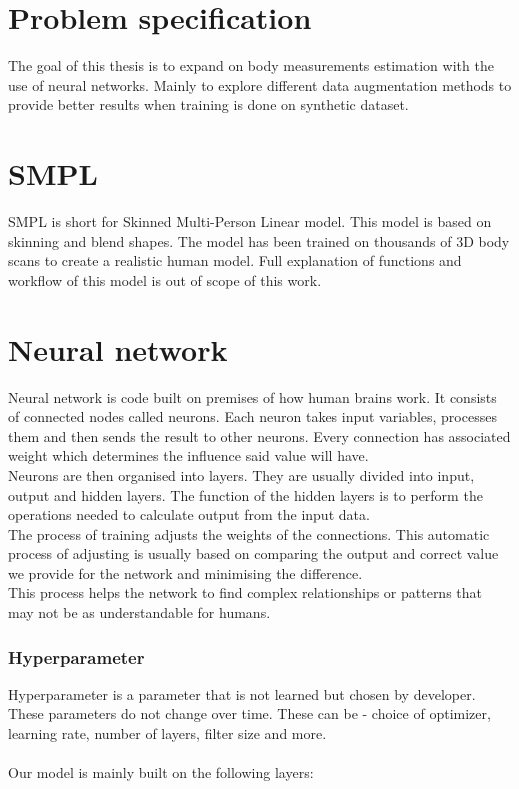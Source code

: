 \section{Problem specification}
The goal of this thesis is to expand on body measurements estimation with the use of neural networks. Mainly to explore different data augmentation methods to provide better results when training is done on synthetic dataset.


\section{SMPL}
SMPL is short for Skinned Multi-Person Linear model. This model is based on skinning and blend shapes. The model has been trained on thousands of 3D body scans to create a realistic human model. Full explanation of functions and workflow of this model is out of scope of this work.


\section{Neural network}
Neural network is code built on premises of how human brains work. It consists of connected nodes called neurons. Each neuron takes input variables, processes them and then sends the result to other neurons. Every connection has associated weight which determines the influence said value will have.\\
Neurons are then organised into layers. They are usually divided into input, output and hidden layers. The function of the hidden layers is to perform the operations needed to calculate output from the input data.\\
The process of training adjusts the weights of the connections. This automatic process of adjusting is usually based on comparing the output and correct value we provide for the network and minimising the difference.\\
This process helps the network to find complex relationships or patterns that may not  be as understandable for humans.

\subsubsection{Hyperparameter}
Hyperparameter is a parameter that is not learned but chosen by developer.  These parameters do not change over time. These can be - choice of optimizer, learning rate,  number of layers, filter size and more.\\\\
Our model is mainly built on the following layers:

